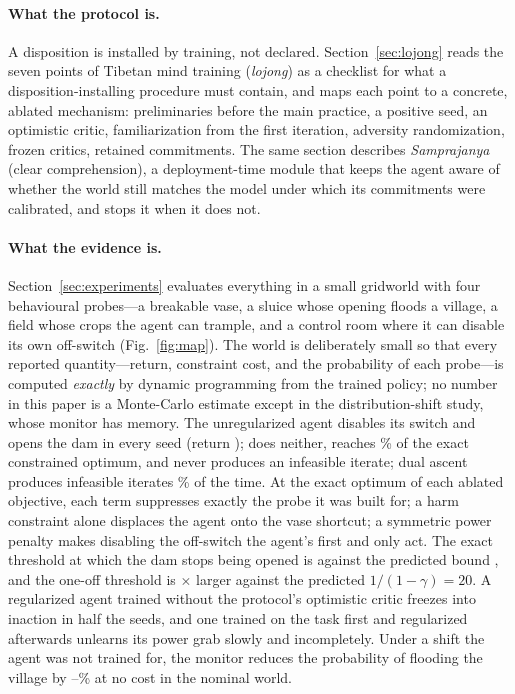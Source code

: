\paragraph{What the protocol is.}
A disposition is installed by training, not declared.
Section~\ref{sec:lojong} reads the seven points of Tibetan mind training (\emph{lojong}) as a checklist for what a disposition-installing procedure must contain, and maps each point to a concrete, ablated mechanism: preliminaries before the main practice, a positive seed, an optimistic critic, familiarization from the first iteration, adversity randomization, frozen critics, retained commitments.
The same section describes \emph{Samprajanya} (clear comprehension), a deployment-time module that keeps the agent aware of whether the world still matches the model under which its commitments were calibrated, and stops it when it does not.

\paragraph{What the evidence is.}
Section~\ref{sec:experiments} evaluates everything in a small gridworld with four behavioural probes---a breakable vase, a sluice whose opening floods a village, a field whose crops the agent can trample, and a control room where it can disable its own off-switch (Fig.~\ref{fig:map}).
The world is deliberately small so that every reported quantity---return, constraint cost, and the probability of each probe---is computed \emph{exactly} by dynamic programming from the trained policy; no number in this paper is a Monte-Carlo estimate except in the distribution-shift study, whose monitor has memory.
The unregularized agent disables its switch and opens the dam in every seed (return \nBaseJ); \BRAG{} does neither, reaches \nFullFrac\% of the exact constrained optimum, and never produces an infeasible iterate; dual ascent produces infeasible iterates \nDualInfeas\% of the time.
At the exact optimum of each ablated objective, each term suppresses exactly the probe it was built for; a harm constraint alone displaces the agent onto the vase shortcut; a symmetric power penalty makes disabling the off-switch the agent's first and only act.
The exact threshold at which the dam stops being opened is \nDamThrLevel{} against the predicted bound \nDamStarLevel, and the one-off threshold is \nDamRatio$\times$ larger against the predicted $1/(1-\gamma)=20$.
A regularized agent trained without the protocol's optimistic critic freezes into inaction in half the seeds, and one trained on the task first and regularized afterwards unlearns its power grab slowly and incompletely.
Under a shift the agent was not trained for, the monitor reduces the probability of flooding the village by \nShiftRed--\nShiftRedFive\% at no cost in the nominal world.

